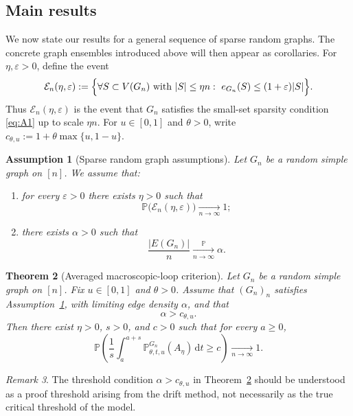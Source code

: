 \documentclass[11pt]{article}
\newtheorem{theorem}{Theorem}[section]
\theoremstyle{remark}
\newtheorem{remark}[theorem]{Remark}
\theoremstyle{plain}
\newtheorem{assumption}[theorem]{Assumption}
\newcommand{\Pbb}{\mathbb{P}}
\newcommand{\1}{\mathbbm{1}}
\newcommand{\dd}{\mathrm{d}}
\begin{document}
\subsection{Main results}

We now state our results for a general sequence of sparse random graphs.
The concrete graph ensembles introduced above will then appear as corollaries.
For \(\eta,\varepsilon>0\), define the event
\[
\mathcal E_n(\eta,\varepsilon)
:=
\Bigl\{
\forall S\subset V(G_n)\text{ with }|S|\le \eta n:\ 
e_{G_n}(S)\le (1+\varepsilon)|S|
\Bigr\}.
\]
Thus \(\mathcal E_n(\eta,\varepsilon)\) is the event that \(G_n\) satisfies the
small-set sparsity condition \eqref{eq:A1} up to scale \(\eta n\).
For \(u\in[0,1]\) and \(\theta>0\), write $c_{\theta,u}:=1+\theta\max\{u,1-u\}$.



\begin{assumption}[Sparse random graph assumptions]
\label{ass:sparse-random-graph}
Let \(G_n\) be a random simple graph on \([n]\). We assume that:
\begin{enumerate}[label=\textnormal{(\alph*)},ref=\textnormal{(\alph*)}]
    \item\label{ass:sparse-random-graph-a}
    for every \(\varepsilon>0\) there exists \(\eta>0\) such that
    \[
    \Pbb\bigl(\mathcal E_n(\eta,\varepsilon)\bigr)\xrightarrow[n\to\infty]{}1;
    \]

    \item\label{ass:sparse-random-graph-b}
    there exists \(\alpha>0\) such that
    \[
    \frac{|E(G_n)|}{n}\xrightarrow[n\to\infty]{\Pbb}\alpha.
    \]
\end{enumerate}
\end{assumption}

\begin{theorem}[Averaged macroscopic-loop criterion]
\label{thm:abstract-averaged}
Let \(G_n\) be a random simple graph on \([n]\). Fix \(u\in[0,1]\) and \(\theta>0\).
Assume that \((G_n)_n\) satisfies Assumption~\ref{ass:sparse-random-graph}, with limiting
edge density \(\alpha\), and that
\[
\alpha>c_{\theta,u}.
\]
Then there exist \(\eta>0\), \(s>0\), and \(c>0\) such that for every \(a\ge 0\),
\[
\Pbb\!\left(
\frac1s\int_a^{a+s}\Pbb^{G_n}_{\theta,t,u}(A_\eta)\,\dd t \ge c
\right)\xrightarrow[n\to\infty]{}1.
\]
\end{theorem}

\begin{remark}
The threshold condition \(\alpha>c_{\theta,u}\) in
Theorem~\ref{thm:abstract-averaged} should be understood as a proof threshold
arising from the drift method, not necessarily as the true critical threshold
of the model.
\end{remark}
\end{document}
